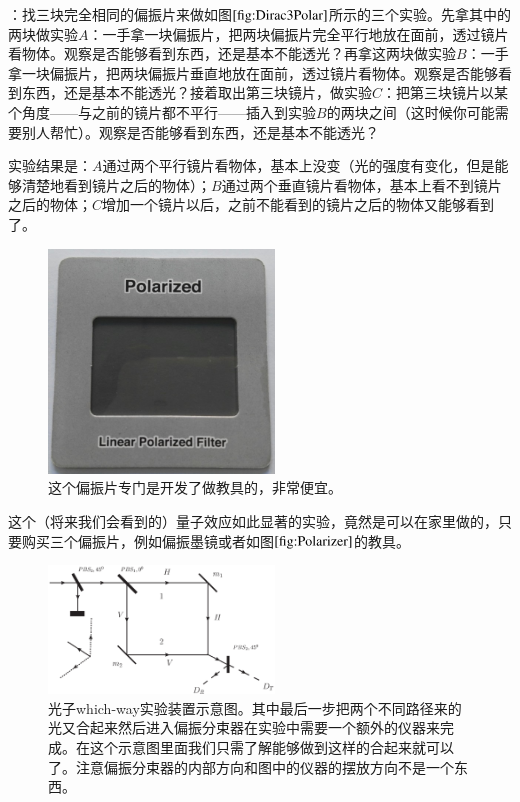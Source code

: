 \documentclass{ctexbook}
\newcommand{\FigLabel}[1]{\label{#1}}
\newcommand{\FigRef}[1]{图$\ref{#1}$}
\begin{document}
\begin{Experiment}
：找三块完全相同的偏振片来做如\FigRef{fig:Dirac3Polar}所示的三个实验。先拿其中的两块做实验$A$：一手拿一块偏振片，把两块偏振片完全平行地放在面前，透过镜片看物体。观察是否能够看到东西，还是基本不能透光？再拿这两块做实验$B$：一手拿一块偏振片，把两块偏振片垂直地放在面前，透过镜片看物体。观察是否能够看到东西，还是基本不能透光？接着取出第三块镜片，做实验$C$：把第三块镜片以某个角度——与之前的镜片都不平行——插入到实验$B$的两块之间（这时候你可能需要别人帮忙）。观察是否能够看到东西，还是基本不能透光？

实验结果是：$A$通过两个平行镜片看物体，基本上没变（光的强度有变化，但是能够清楚地看到镜片之后的物体）；$B$通过两个垂直镜片看物体，基本上看不到镜片之后的物体；$C$增加一个镜片以后，之前不能看到的镜片之后的物体又能够看到了。
\end{Experiment}

\begin{figure}
\begin{center}
\includegraphics[width=6cm]{figure/Polarizer.jpg}
\caption[便宜的偏振片]{这个偏振片专门是开发了做教具的，非常便宜。}
\FigLabel{fig:Polarizer}
\end{center}
\end{figure}
这个（将来我们会看到的）量子效应如此显著的实验，竟然是可以在家里做的，只要购买三个偏振片，例如偏振墨镜或者如\FigRef{fig:Polarizer}的教具。

\begin{figure}
\begin{center}
\includegraphics[width=6cm]{figure/QMPBS.eps}
\caption[光子which-way实验装置示意图]{光子which-way实验装置示意图。其中最后一步把两个不同路径来的光又合起来然后进入偏振分束器在实验中需要一个额外的仪器来完成。在这个示意图里面我们只需了解能够做到这样的合起来就可以了。注意偏振分束器的内部方向和图中的仪器的摆放方向不是一个东西。}
\FigLabel{fig:QMPBS}
\end{center}
\end{figure}
\end{document}
